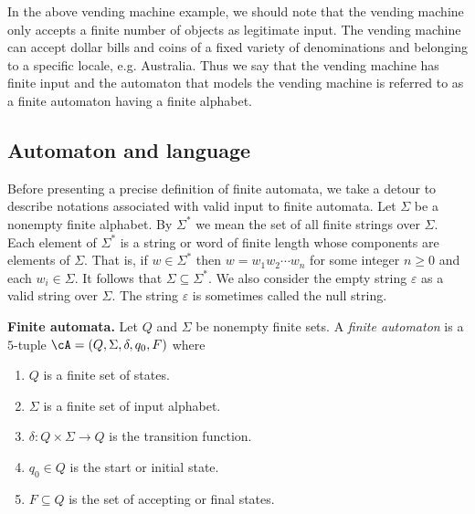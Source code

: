 In the above vending machine example, we should
note that the vending machine only accepts a finite number of objects
as legitimate input. The vending machine can accept dollar bills and
coins of a fixed variety of denominations and belonging to a specific
locale, e.g. Australia. Thus we say that the vending machine has
finite input and the automaton that models the vending machine is
referred to as a finite automaton having a finite alphabet.



\subsection{Automaton and language}

Before presenting a precise definition of finite automata, we take a
detour to describe notations associated with valid input to finite
automata. Let $\Sigma$ be a nonempty finite
alphabet. By $\Sigma^\ast$ we mean the set of all
finite strings over $\Sigma$. Each element of
$\Sigma^\ast$ is a string or word of finite length whose
components are elements of $\Sigma$. That is, if $w \in \Sigma^\ast$
then $w = w_1 w_2 \cdots w_n$ for some integer $n \geq 0$ and each
$w_i \in \Sigma$. It follows that $\Sigma \subseteq \Sigma^{\ast}$.
We also consider the empty string $\varepsilon$ as a valid string over
$\Sigma$. The string $\varepsilon$ is sometimes called the null string.

\begin{definition}
\textbf{Finite automata.}
Let $Q$ and $\Sigma$ be nonempty finite sets.  A
\emph{finite automaton} is a $5$-tuple
$\cA = (Q, \Sigma, \delta, q_0, F)$ where
\begin{enumerate} \parskip=0.0in
  \item $Q$ is a finite set of states.

  \item $\Sigma$ is a finite set of input alphabet.

  \item $\delta : Q \times \Sigma \to Q$ is the
    transition function.

  \item $q_0 \in Q$ is the start or initial state.

  \item $F \subseteq Q$ is the set of accepting
    or final states.
\end{enumerate}
\end{definition}


